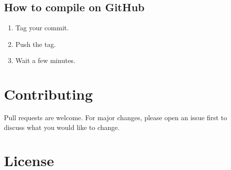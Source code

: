 \documentclass{article}
\begin{document}
\subsection{How to compile on GitHub}

\begin{enumerate}
  \item Tag your commit.
  \item Push the tag.
  \item Wait a few minutes.
\end{enumerate}

\section{Contributing}

Pull requests are welcome.
For major changes,
please open an issue first to discuss what you would like to change.

\section{License}


\end{document}
